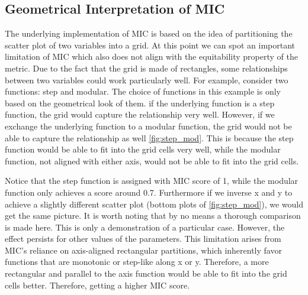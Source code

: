 \documentclass{article}
\begin{document}
\subsection{Geometrical Interpretation of MIC}
The underlying implementation of MIC is based on the idea of partitioning the scatter plot of two variables into a grid. At this point we can spot an important limitation of MIC which also does not align with the equitability property of the metric. Due to the fact that the grid is made of rectangles, some relationships between two variables could work particularly well. For example, consider two functions: step and modular. The choice of functions in this example is only based on the geometrical look of them. if the underlying function is a step function, the grid would capture the relationship very well. However, if we exchange the underlying function to a modular function, the grid would not be able to capture the relationship as well \autoref{fig:step_mod}. This is because the step function would be able to fit into the grid cells very well, while the modular function, not aligned with either axis, would not be able to fit into the grid cells. 

Notice that the step function is assigned with MIC score of 1, while the modular function only achieves a score around 0.7. Furthermore if we inverse x and y to achieve a slightly different scatter plot (bottom plots of \autoref{fig:step_mod}), we would get the same picture. It is worth noting that by no means a thorough comparison is made here. This is only a demonstration of a particular case. However, the effect persists for other values of the parameters. This limitation arises from MIC's reliance on axis-aligned rectangular partitions, which inherently favor functions that are monotonic or step-like along x or y. Therefore, a more rectangular and parallel to the axis function would be able to fit into the grid cells better. Therefore, getting a higher MIC score. 
\end{document}
